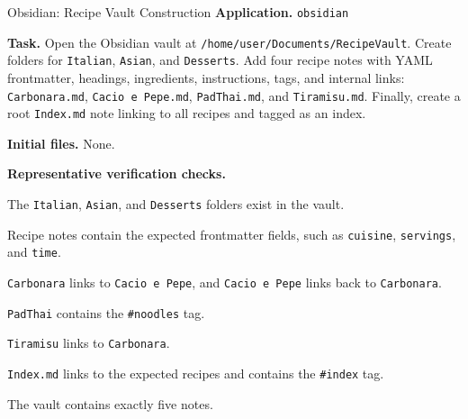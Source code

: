 \documentclass{llmxive}
\providecommand{\taskfield}[1]{\vspace{0.25em}\noindent\textbf{#1.}}
\begin{document}
\begin{taskexample}{Obsidian: Recipe Vault Construction}
\taskfield{Application} \texttt{obsidian}

\taskfield{Task} Open the Obsidian vault at
\texttt{/home/user/Documents/RecipeVault}. Create folders for
\texttt{Italian}, \texttt{Asian}, and \texttt{Desserts}. Add four recipe notes
with YAML frontmatter, headings, ingredients, instructions, tags, and internal
links: \texttt{Carbonara.md}, \texttt{Cacio e Pepe.md},
\texttt{PadThai.md}, and \texttt{Tiramisu.md}. Finally, create a root
\texttt{Index.md} note linking to all recipes and tagged as an index.

\taskfield{Initial files}
None.

\taskfield{Representative verification checks}
\begin{compactitem}
    \item The \texttt{Italian}, \texttt{Asian}, and \texttt{Desserts} folders
    exist in the vault.
    \item Recipe notes contain the expected frontmatter fields, such as
    \texttt{cuisine}, \texttt{servings}, and \texttt{time}.
    \item \texttt{Carbonara} links to \texttt{Cacio e Pepe}, and
    \texttt{Cacio e Pepe} links back to \texttt{Carbonara}.
    \item \texttt{PadThai} contains the \texttt{\#noodles} tag.
    \item \texttt{Tiramisu} links to \texttt{Carbonara}.
    \item \texttt{Index.md} links to the expected recipes and contains the
    \texttt{\#index} tag.
    \item The vault contains exactly five notes.
\end{compactitem}
\end{taskexample}
\end{document}

